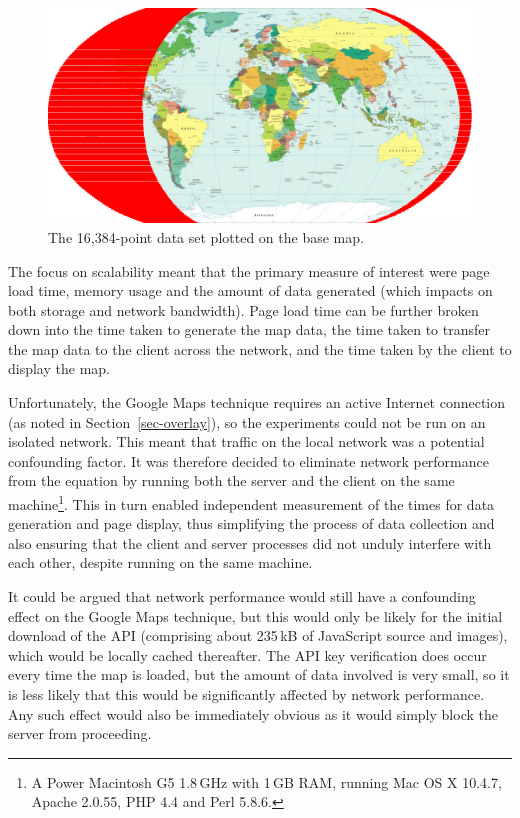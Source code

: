 \documentclass[acmnow]{acmtrans2m}
\begin{document}
\begin{figure}
	\centering
	\includegraphics[width=\textwidth,keepaspectratio]{16384_points}
	\caption{The 16,384-point data set plotted on the base map.}
	\label{fig-grid-points}
\end{figure}


The focus on scalability meant that the primary measure of interest were
page load time, memory usage and the amount of data generated (which
impacts on both storage and network bandwidth). Page load time can be
further broken down into the time taken to generate the map data, the
time taken to transfer the map data to the client across the network,
and the time taken by the client to display the map.

Unfortunately, the Google Maps technique requires an active Internet
connection (as noted in Section~\ref{sec-overlay}), so the experiments
could not be run on an isolated network. This meant that traffic on the
local network was a potential confounding factor. It was therefore
decided to eliminate network performance from the equation by running
both the server and the client on the same machine\footnote{A Power
Macintosh G5 1.8\,GHz with 1\,GB RAM, running Mac OS X 10.4.7, Apache
2.0.55, PHP 4.4 and Perl 5.8.6.}. This in turn enabled independent
measurement of the times for data generation and page display, thus
simplifying the process of data collection and also ensuring that the
client and server processes did not unduly interfere with each other,
despite running on the same machine.

It could be argued that network performance would still have a
confounding effect on the Google Maps technique, but this would only be
likely for the initial download of the API (comprising about 235\,kB of
JavaScript source and images), which would be locally cached thereafter.
The API key verification does occur every time the map is loaded, but
the amount of data involved is very small, so it is less likely that
this would be significantly affected by network performance. Any such
effect would also be immediately obvious as it would simply block the
server from proceeding.
\end{document}
